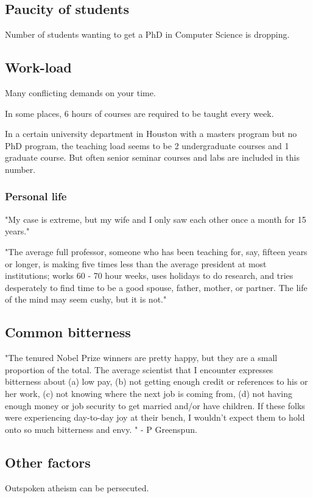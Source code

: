 \documentclass[oneside, article]{memoir}
\begin{document}
\subsection{Paucity of students}
Number of students wanting to get a PhD in Computer Science is dropping.

\subsection{Work-load}
Many conflicting demands on your time.

In some places, 6 hours of courses are required to be taught every week.

In a certain university department in Houston with a masters program but no PhD program, the teaching load seems to be 2 undergraduate courses and 1 graduate course. But often senior seminar courses and labs are included in this number.

\subsubsection{Personal life}
"My case is extreme, but my wife and I only saw each other once a month for 15 years."

"The average full professor, someone who has been teaching for, say, fifteen years or longer, is making five times less than the average president at most institutions; works 60 - 70 hour weeks, uses holidays to do research, and tries desperately to find time to be a good spouse, father, mother, or partner. The life of the mind may seem cushy, but it is not." 

\subsection{Common bitterness}
"The tenured Nobel Prize winners are pretty happy, but they are a small proportion of the total. The average scientist that I encounter expresses bitterness about (a) low pay, (b) not getting enough credit or references to his or her work, (c) not knowing where the next job is coming from, (d) not having enough money or job security to get married and/or have children. If these folks were experiencing day-to-day joy at their bench, I wouldn't expect them to hold onto so much bitterness and envy. " - P Greenspun.



\subsection{Other factors}
Outspoken atheism can be persecuted.
\end{document}
